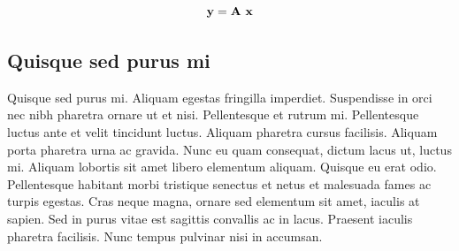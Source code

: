 \begin{equation}
\mathbf{y} = \mathbf{A} \ \mathbf{x}
\end{equation}

\subsection{Quisque sed purus mi}

Quisque sed purus mi. Aliquam egestas fringilla imperdiet. Suspendisse in orci nec nibh pharetra ornare ut et nisi. Pellentesque et rutrum mi. Pellentesque luctus ante et velit tincidunt luctus. Aliquam pharetra cursus facilisis. Aliquam porta pharetra urna ac gravida. Nunc eu quam consequat, dictum lacus ut, luctus mi. Aliquam lobortis sit amet libero elementum aliquam. Quisque eu erat odio. Pellentesque habitant morbi tristique senectus et netus et malesuada fames ac turpis egestas. Cras neque magna, ornare sed elementum sit amet, iaculis at sapien. Sed in purus vitae est sagittis convallis ac in lacus. Praesent iaculis pharetra facilisis. Nunc tempus pulvinar nisi in accumsan.
